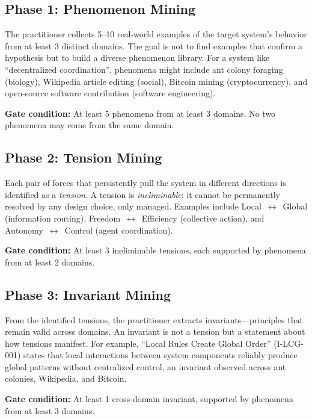 \documentclass[11pt,a4paper]{article}
\begin{document}
\subsection{Phase 1: Phenomenon Mining}

The practitioner collects 5--10 real-world examples of the target system's behavior from at least 3 distinct domains. The goal is not to find examples that confirm a hypothesis but to build a diverse phenomenon library. For a system like ``decentralized coordination'', phenomena might include ant colony foraging (biology), Wikipedia article editing (social), Bitcoin mining (cryptocurrency), and open-source software contribution (software engineering).

\textbf{Gate condition:} At least 5 phenomena from at least 3 domains. No two phenomena may come from the same domain.

\subsection{Phase 2: Tension Mining}

Each pair of forces that persistently pull the system in different directions is identified as a \emph{tension}. A tension is \emph{ineliminable}: it cannot be permanently resolved by any design choice, only managed. Examples include Local~$\leftrightarrow$~Global (information routing), Freedom~$\leftrightarrow$~Efficiency (collective action), and Autonomy~$\leftrightarrow$~Control (agent coordination).

\textbf{Gate condition:} At least 3 ineliminable tensions, each supported by phenomena from at least 2 domains.

\subsection{Phase 3: Invariant Mining}

From the identified tensions, the practitioner extracts invariants---principles that remain valid across domains. An invariant is not a tension but a statement about how tensions manifest. For example, ``Local Rules Create Global Order'' (I-LCG-001) states that local interactions between system components reliably produce global patterns without centralized control, an invariant observed across ant colonies, Wikipedia, and Bitcoin.

\textbf{Gate condition:} At least 1 cross-domain invariant, supported by phenomena from at least 3 domains.
\end{document}
